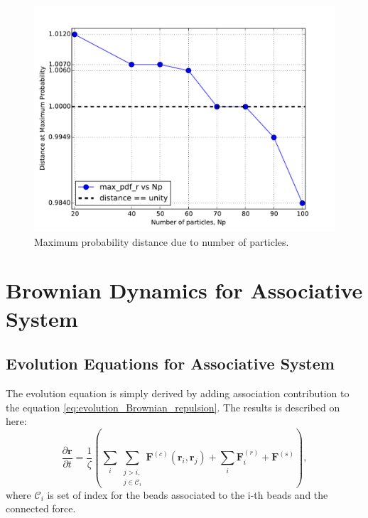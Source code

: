 \documentclass[10pt, a4paper]{report}
\begin{document}
\begin{figure}
  \centering
  \includegraphics[width=\textwidth]{figures/distance_dist.pdf}
  \caption{Maximum probability distance due to number of particles.}\label{fig:distance_distribution_repulsion}
\end{figure}






\chapter{Brownian Dynamics for Associative System}
\section{Evolution Equations for Associative System}
The evolution equation is simply derived by adding association contribution to the equation \eqref{eq:evolution_Brownian_repulsion}. The results is described on here:
\begin{equation}
\frac{\partial \mathbf{r}}{\partial t} = \frac{1}{\zeta}\left(\sum_{i}\sum_{\substack{j>i,\\j\in\mathscr{C}_i}} \mathbf{F}^{(c)}(\mathbf{r}_i, \mathbf{r}_j) + \sum_i \mathbf{F}^{(r)}_i + \mathbf{F}^{(s)}\right),\label{eq:evolution_Brownian_repulsion_association}
\end{equation}
where $\mathscr{C}_i$ is set of index for the beads associated to the i-th beads and the connected force. 
\end{document}
